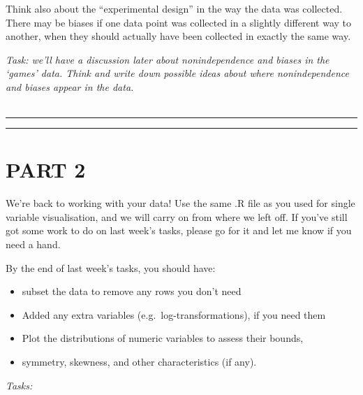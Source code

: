 \documentclass[
]{book}
\providecommand{\tightlist}{%
  \setlength{\itemsep}{0pt}\setlength{\parskip}{0pt}}
\begin{document}
Think also about the ``experimental design'' in the way the data was collected.
There may be biases if one data point was collected in a slightly different
way to another, when they should actually have been collected in exactly the
same way.

\emph{Task: we'll have a discussion later about nonindependence and biases in the
`games' data. Think and write down possible ideas about where nonindependence
and biases appear in the data.}\\
~\\

\begin{center}\rule{0.5\linewidth}{0.5pt}\end{center}

\begin{center}\rule{0.5\linewidth}{0.5pt}\end{center}

\hypertarget{part-2}{%
\section{PART 2}\label{part-2}}

We're back to working with your data! Use the same .R file as you used for
single variable visualisation, and we will carry on from where we left off.
If you've still got some work to do on last week's tasks, please go for it and let
me know if you need a hand.

By the end of last week's tasks, you should have:

\begin{itemize}
\tightlist
\item
  subset the data to remove any rows you don't need
\item
  Added any extra variables (e.g.~log-transformations), if you need them
\item
  Plot the distributions of numeric variables to assess their bounds,
\item
  symmetry, skewness, and other characteristics (if any).\\
\end{itemize}

\emph{Tasks:}
\end{document}
